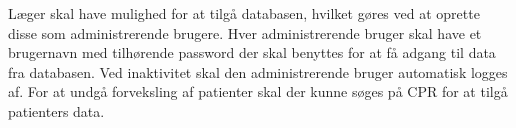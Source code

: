 Læger skal have mulighed for at tilgå databasen, hvilket gøres ved at oprette disse som administrerende brugere.
Hver administrerende bruger skal have et brugernavn med tilhørende password der skal benyttes for at få adgang til data fra databasen. Ved inaktivitet skal den administrerende bruger automatisk logges af. For at undgå forveksling af patienter skal der kunne søges på CPR for at tilgå patienters data. \\
 \\


